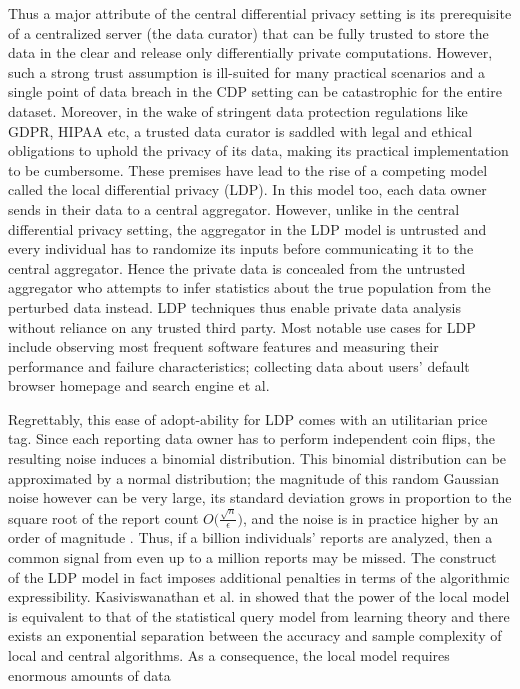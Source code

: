 \par Thus a major attribute of the central differential privacy setting is its prerequisite of a centralized server (the data curator) that can be fully trusted to store the data in the clear and release only differentially private computations. However, such a strong trust assumption is ill-suited for many practical scenarios and a single point of data breach in the \textsf{CDP} setting can be catastrophic for the entire dataset. Moreover, in the wake of stringent data protection regulations like \textsf{GDPR}, \textsf{HIPAA} etc, a trusted data curator is saddled with legal and ethical obligations to uphold the privacy of its data, making its practical implementation to be cumbersome. These premises have lead to the rise of a competing model called the local differential privacy (\textsf{LDP}). In this model too, each data owner sends in their data to a central aggregator. However, unlike in the central differential privacy setting, the aggregator in the LDP model is untrusted and every individual has to randomize its inputs before communicating it to the central aggregator. Hence the private data is concealed from the untrusted aggregator who attempts to infer statistics about the true population from the perturbed data instead. LDP techniques thus enable private data analysis without reliance on any  trusted third party. Most notable use cases for LDP include observing most frequent software features and measuring
their performance and failure characteristics; collecting data about users' default browser homepage and search engine et al. \par Regrettably, this ease of adopt-ability for \textsf{LDP} comes with an utilitarian price tag. Since each reporting data owner has to 
perform independent coin flips, the resulting noise induces a binomial distribution. This binomial distribution can be approximated by a normal distribution; the magnitude of this random Gaussian
noise however can be very large, its
standard deviation grows in proportion to the square root of
the report count $ O\big(\frac{\sqrt{n}}{\epsilon}\big)$, and the noise is in practice higher by an
order of magnitude \cite{Prochlo,Rappor1,Rappor2,LDP1}. Thus, if a billion individuals'
reports are analyzed, then a common signal from even
up to a million reports may be missed. The construct of the \textsf{LDP} model in fact imposes additional penalties in terms of the  algorithmic expressibility.  Kasiviswanathan et al. in \cite{Kasivi} showed that the power of the local model is equivalent to that of the statistical query model \cite{SQ1} from learning theory and there exists an exponential separation between the accuracy and sample complexity of local and central algorithms.  As a consequence, the local model requires enormous amounts of data \cite{Kasivi}
